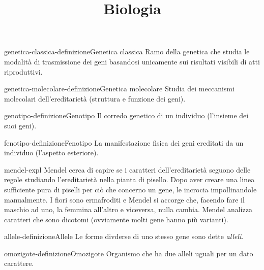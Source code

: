 \documentclass[preview]{standalone}
\begin{document}
\title{Biologia}
\genpage

\begin{snippetdefinition}{genetica-classica-definizione}{Genetica classica}
    Ramo della genetica che studia le modalità di trasmissione
    dei geni basandosi unicamente sui risultati visibili di atti riproduttivi.
\end{snippetdefinition}

\begin{snippetdefinition}{genetica-molecolare-definizione}{Genetica molecolare}
    Studia dei meccanismi molecolari dell'ereditarietà (struttura e funzione dei geni).
\end{snippetdefinition}

\begin{snippetdefinition}{genotipo-definizione}{Genotipo}
    Il corredo genetico di un individuo (l'insieme dei suoi geni).
\end{snippetdefinition}

\begin{snippetdefinition}{fenotipo-definizione}{Fenotipo}
    La manifestazione fisica dei geni ereditati da un individuo
    (l'aspetto esteriore).
\end{snippetdefinition}


\begin{snippet}{mendel-expl}
    Mendel cerca di capire se i caratteri dell'ereditarietà
    seguono delle regole studiando l'ereditarietà nella pianta di pisello.
    Dopo aver creare una linea sufficiente pura di piselli per ciò che concerno un gene,
    le incrocia impollinandole manualmente.
    I fiori sono ermafroditi e Mendel si accorge che, facendo fare il maschio ad uno, la femmina all'altro
    e viceversa, nulla cambia.
    Mendel analizza caratteri che sono dicotomi (ovviamente molti gene hanno più varianti).
\end{snippet}

\begin{snippetdefinition}{allele-definizione}{Allele}
    Le forme divderse di uno stesso gene sono dette \textit{alleli}.
\end{snippetdefinition}

\begin{snippetdefinition}{omozigote-definizione}{Omozigote}
    Organismo che ha due alleli uguali per un dato carattere.
\end{snippetdefinition}
\end{document}
